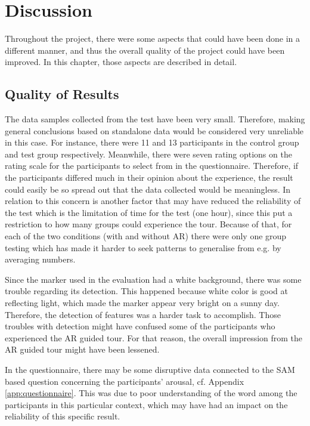 \chapter{Discussion}\label{ch:discussion}
Throughout the project, there were some aspects that could have been done in a different manner, and thus the overall quality of the project could have been improved. In this chapter, those aspects are described in detail.

\section{Quality of Results}
The data samples collected from the test have been very small. Therefore, making general conclusions based on standalone data would be considered very unreliable in this case. For instance, there were 11 and 13 participants in the control group and test group respectively. Meanwhile, there were seven rating options on the rating scale for the participants to select from in the questionnaire. Therefore, if the participants differed much in their opinion about the experience, the result could easily be so spread out that the data collected would be meaningless. In relation to this concern is another factor that may have reduced the reliability of the test which is the limitation of time for the test (one hour), since this put a restriction to how many groups could experience the tour. Because of that, for each of the two conditions (with and without AR) there were only one group testing which has made it harder to seek patterns to generalise from e.g. by averaging numbers.

Since the marker used in the evaluation had a white background, there was some trouble regarding its detection. This happened because white color is good at reflecting light, which made the marker appear very bright on a sunny day. Therefore, the detection of features was a harder task to accomplish. Those troubles
with detection might have confused some of the participants who experienced the AR guided tour. For that reason, the overall impression from the AR guided tour might have been lessened.\pagebreak

In the questionnaire, there may be some disruptive data connected to the SAM based question concerning the participants’ arousal, cf. Appendix \ref{app:questionnaire}. This was due to poor understanding of the word among the participants in this particular context, which may have had an impact on the reliability of this specific result.

